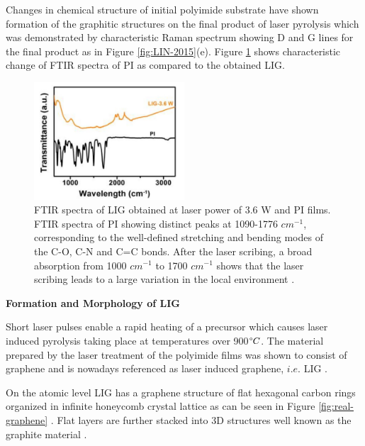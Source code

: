 Changes in chemical structure of initial polyimide substrate have shown formation of the graphitic structures on the final product of laser pyrolysis which was demonstrated by characteristic Raman spectrum showing D and G lines for the final product as in Figure \ref{fig:LIN-2015}(e). Figure \ref{fig:LIG-FTIR_Lin} shows characteristic change of FTIR spectra of PI as compared to the obtained LIG.

\begin{figure}[H]
\centering
\includegraphics[width=0.5\textwidth]{Figures/Theory/FTIR_LIG_Lin.jpg}
\medskip
\caption{FTIR  spectra of LIG obtained at laser power of 3.6 W  and  PI  films. FTIR  spectra of PI showing distinct peaks  at  1090-1776 $cm^{-1}$, corresponding  to  the  well-defined  stretching  and bending modes of the C-O, C-N and C=C bonds. After the laser scribing, a broad absorption from 1000 $cm^{-1}$ to 1700 $cm^{-1}$ shows that the laser scribing leads to a large variation in the local environment \cite{lin_laser-induced_2014}.}
\label{fig:LIG-FTIR_Lin}
\end{figure}

\textbf{Formation and Morphology of LIG}

Short laser pulses enable a rapid heating of a precursor which causes laser induced pyrolysis taking place at temperatures over 900$\degree C$. The material prepared by the laser treatment of the polyimide films was shown to consist of graphene and is nowadays referenced as laser induced graphene, $i.e.$ LIG \cite{lin_laser-induced_2014}. 

On the atomic level LIG has a graphene structure of flat hexagonal carbon rings organized in infinite honeycomb crystal lattice as can be seen in Figure \ref{fig:real-graphene} \cite{Graphene}. Flat layers are further stacked into 3D structures well known as the graphite material \cite{katsnelson_2012}. 


